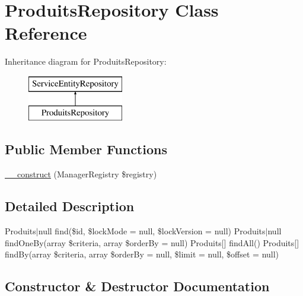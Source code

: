 \hypertarget{class_app_1_1_repository_1_1_produits_repository}{}\section{Produits\+Repository Class Reference}
\label{class_app_1_1_repository_1_1_produits_repository}
Inheritance diagram for Produits\+Repository\+:\begin{figure}[H]
\begin{center}
\leavevmode
\includegraphics[height=2.000000cm]{class_app_1_1_repository_1_1_produits_repository}
\end{center}
\end{figure}
\subsection*{Public Member Functions}
\begin{DoxyCompactItemize}
\item 
\mbox{\hyperlink{class_app_1_1_repository_1_1_produits_repository_a38ea33dde11163765f358f5f10a3bc03}{\+\_\+\+\_\+construct}} (Manager\+Registry \$registry)
\end{DoxyCompactItemize}


\subsection{Detailed Description}
Produits$\vert$null find(\$id, \$lock\+Mode = null, \$lock\+Version = null)  Produits$\vert$null find\+One\+By(array \$criteria, array \$order\+By = null)  Produits\mbox{[}\mbox{]} find\+All()  Produits\mbox{[}\mbox{]} find\+By(array \$criteria, array \$order\+By = null, \$limit = null, \$offset = null) 

\subsection{Constructor \& Destructor Documentation}
\mbox{\label{class_app_1_1_repository_1_1_produits_repository_a38ea33dde11163765f358f5f10a3bc03}} 
